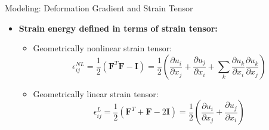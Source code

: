 \documentclass[10pt, aspectratio=169]{beamer}
\begin{document}
\begin{frame}{Modeling: Deformation Gradient and Strain Tensor}
\begin{itemize}
        \vspace{0.2cm}
        \item \textbf{\color{AcademicNavy} Strain energy defined in terms of strain tensor:}
        \vspace{-0.1cm}
        \begin{itemize}
            \item Geometrically nonlinear strain tensor:
            \vspace{-0.15cm}
            \begin{equation*}
                \epsilon_{ij}^{NL} = \frac{1}{2}(\mathbf{F}^T \mathbf{F} - \mathbf{I}) = \frac{1}{2} \left( \frac{\partial u_i}{\partial x_j} + \frac{\partial u_j}{\partial x_i} + \sum_k \frac{\partial u_k}{\partial x_i} \frac{\partial u_k}{\partial x_j} \right)
            \end{equation*}
            \vspace{-0.3cm}
            \item Geometrically linear strain tensor:
            \vspace{-0.15cm}
            \begin{equation*}
                \epsilon_{ij}^{L} = \frac{1}{2}(\mathbf{F}^T + \mathbf{F} - 2\mathbf{I}) = \frac{1}{2} \left( \frac{\partial u_i}{\partial x_j} + \frac{\partial u_j}{\partial x_i} \right)
            \end{equation*}
        \end{itemize}
    \end{itemize}
\end{frame}
\end{document}
